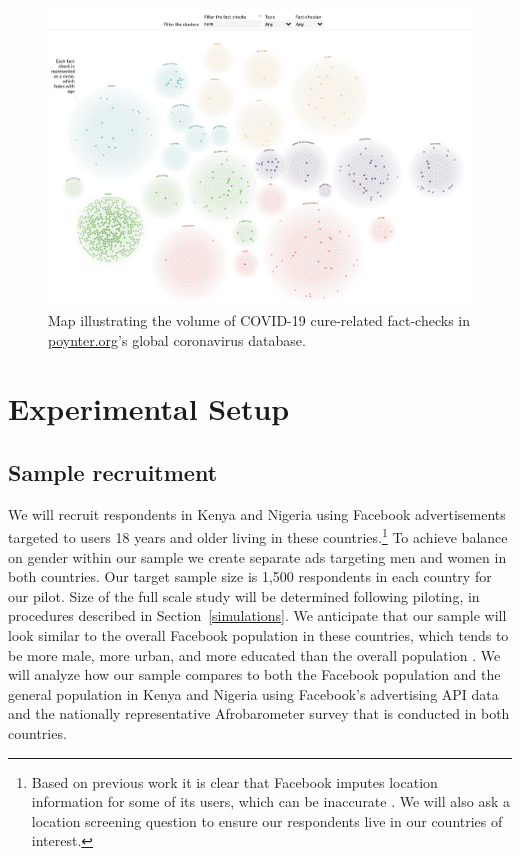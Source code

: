 \documentclass[letterpaper, 12pt, parskip=full,]{scrartcl}
\begin{document}
\begin{figure}[t]
\centering
\caption{Map illustrating the volume of COVID-19 cure-related fact-checks in \url{poynter.org}'s global coronavirus database.}
\label{fig:poynter_cures}
\includegraphics[width=.95\textwidth]{poynter_cures.png} 
\end{figure}


\FloatBarrier
\section{Experimental Setup}



\subsection{Sample recruitment}
We will recruit respondents in Kenya and Nigeria using Facebook advertisements targeted to users 18 years and older living in these countries.\footnote{Based on previous work it is clear that Facebook imputes location information for some of its users, which can be inaccurate \citep{Rosenzweig_2020}. We will also ask a location screening question to ensure our respondents live in our countries of interest.} %
To achieve balance on gender within our sample we create separate ads targeting men and women in both countries. Our target sample size is 1,500 respondents in each country for our pilot. Size of the full scale study will be determined following piloting, in procedures described in Section~\ref{simulations}. We anticipate that our sample will look similar to the overall Facebook population in these countries, which tends to be more male, more urban, and more educated than the overall population \citep{Rosenzweig_2020}. We will analyze how our sample compares to both the Facebook population and the general population in Kenya and Nigeria using Facebook's advertising API data and the nationally representative Afrobarometer survey that is conducted in both countries. 
\end{document}
